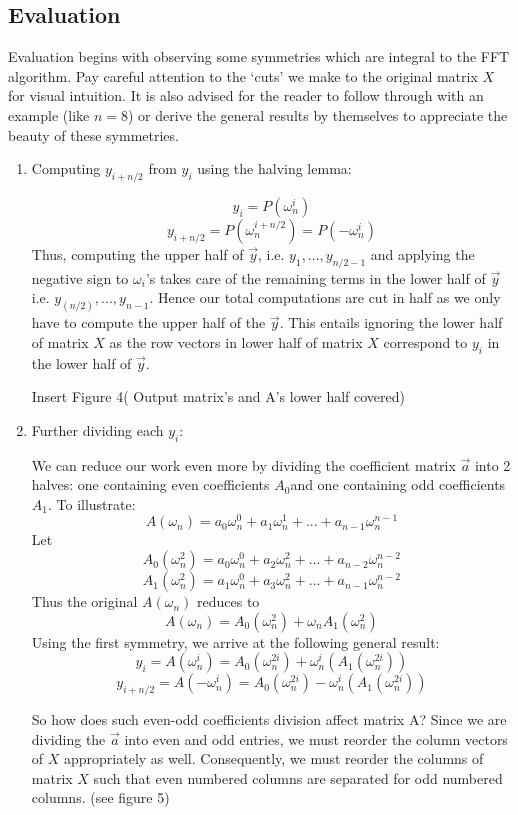 \documentclass{article}
\newcommand{\om}{\omega_n}
\begin{document}
  \subsection{Evaluation}

    Evaluation begins with observing some symmetries which are integral to
    the FFT algorithm. Pay careful attention to the `cuts' we make to the
    original matrix \(X\) for visual intuition. It is also advised
    for the reader to follow through with an example (like \(n = 8\)) or
    derive the general
    results by themselves to appreciate the beauty of these symmetries.
    \begin{enumerate}
      \item Computing \(y_{i + n/2}\) from \(y_{i}\) using the halving lemma:

      \[
        y_{i} = P (\om^{i})
      \]
      \[
        y_{i+n/2} = P (\om^{i+n/2}) = P (-\om^{i})
      \]
      Thus, computing the upper half of \(\vec{y}\),
      i.e. \({y_1, ... , y_{n/2 -1}}\) and applying the negative sign
      to \(\omega_i\)'s takes care of the remaining terms
      in the lower half of \(\vec{y}\)  i.e.
      \({y_(n/2), ... , y_{n-1}}\). Hence our total computations are cut in
      half as we only have to compute the upper half of the \(\vec{y}\).
      This entails ignoring the lower half of matrix \(X\) as the row vectors
      in lower half of matrix \(X\) correspond to \(y_i\) in the lower half of
      \(\vec{y}\).

      Insert Figure 4( Output matrix's and A's lower half covered)

      \item Further dividing each \(y_i\):

      We can reduce our work even more by dividing the coefficient matrix
      \(\vec{a}\)  into
      2 halves: one containing even coefficients \(A_0\)and one containing
      odd coefficients \(A_1\).
      To illustrate:
      \[ A(\om) = a_0\om^0 + a_1\om^1 + ... +a_{n-1}\om^{n-1} \]
      Let
      \[ A_0(\om^{2}) = a_0\om^0 + a_2\om^2 + ... + a_{n-2}\om^{n-2} \]
      \[ A_1(\om^{2}) = a_1\om^0 + a_3\om^2 + ... + a_{n-1}\om^{n-2} \]
      Thus the original \(A(\om)\) reduces to
      \[ A(\om) = A_0(\om^{2}) +\om A_1(\om^{2}) \]
      Using the first symmetry, we arrive  at the following general result:
      \[ y_{i} = A(\om^{i}) = A_0(\om^{2i}) +\om^i(A_1(\om^{2i})) \]
      \[ y_{i+n/2}= A(-\om^{i}) = A_0(\om^{2i}) -\om^i(A_1(\om^{2i})) \]

      So how does such even-odd coefficients division affect matrix A? Since
      we are dividing the \(\vec{a}\) into even and odd entries, we
      must reorder the column vectors of \(X\) appropriately as well. Consequently,
      we must reorder the columns of matrix \(X\) such that even numbered columns are
      separated for odd numbered columns. (see figure 5)


\end{enumerate}
\end{document}
